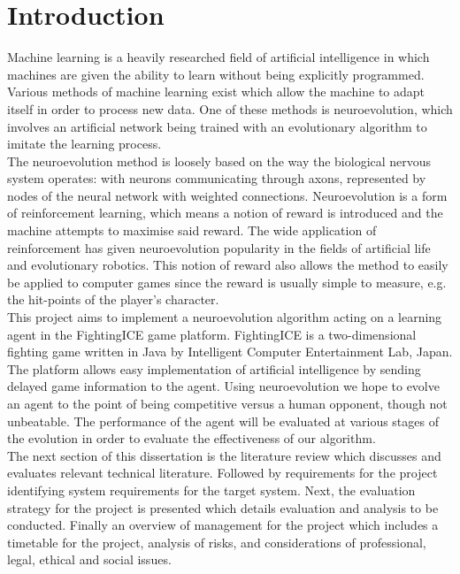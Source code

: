 \documentclass[12pt,a4paper]{article}
\begin{document}
\section{Introduction}
Machine learning is a heavily researched field of artificial intelligence in which machines are given the ability to learn without being explicitly programmed. Various methods of machine learning exist which allow the machine to adapt itself in order to process new data. One of these methods is neuroevolution, which involves an artificial network being trained with an evolutionary algorithm to imitate the learning process.\\

The neuroevolution method is loosely based on the way the biological nervous system operates: with neurons communicating through axons, represented by nodes of the neural network with weighted connections. Neuroevolution is a form of reinforcement learning, which means a notion of reward is introduced and the machine attempts to maximise said reward. The wide application of reinforcement has given neuroevolution popularity in the fields of artificial life and evolutionary robotics. This notion of reward also allows the method to easily be applied to computer games since the reward is usually simple to measure, e.g. the hit-points of the player's character.\\

This project aims to implement a neuroevolution algorithm acting on a learning agent in the FightingICE game platform. FightingICE is a two-dimensional fighting game written in Java by Intelligent Computer Entertainment Lab, Japan. The platform allows easy implementation of artificial intelligence by sending delayed game information to the agent. Using neuroevolution we hope to evolve an agent to the point of being competitive versus a human opponent, though not unbeatable. The performance of the agent will be evaluated at various stages of the evolution in order to evaluate the effectiveness of our algorithm.\\

The next section of this dissertation is the literature review which discusses and evaluates relevant technical literature. Followed by requirements for the project identifying system requirements for the target system. Next, the evaluation strategy for the project is presented which details evaluation and analysis to be conducted. Finally an overview of management for the project which includes a timetable for the project, analysis of risks, and considerations of professional, legal, ethical and social issues.
\newpage
\end{document}
